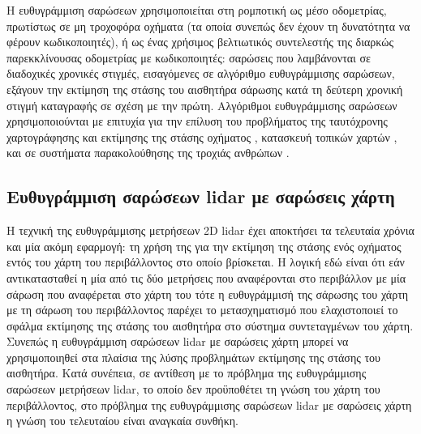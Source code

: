 \begin{gg_box}
\begin{remark}
\label{rem:sm_applications}
Η ευθυγράμμιση σαρώσεων χρησιμοποιείται στη ρομποτική ως μέσο οδομετρίας,
πρωτίστως σε μη τροχοφόρα οχήματα (τα οποία συνεπώς δεν έχουν τη δυνατότητα να
φέρουν κωδικοποιητές), ή ως ένας χρήσιμος βελτιωτικός συντελεστής της διαρκώς
παρεκκλίνουσας οδομετρίας με κωδικοποιητές: σαρώσεις που λαμβάνονται σε
διαδοχικές χρονικές στιγμές, εισαγόμενες σε αλγόριθμο ευθυγράμμισης
σαρώσεων, εξάγουν την εκτίμηση της στάσης του αισθητήρα σάρωσης κατά τη
δεύτερη χρονική στιγμή καταγραφής σε σχέση με την πρώτη. Αλγόριθμοι
ευθυγράμμισης σαρώσεων χρησιμοποιούνται με επιτυχία για την επίλυση του
προβλήματος της ταυτόχρονης χαρτογράφησης και εκτίμησης της στάσης οχήματος
\cite{Gutmann,Hahnel,Chieh-ChihWang}, κατασκευή τοπικών χαρτών
\cite{Lacroix2002a,Minguez,Montesano2008a}, και σε συστήματα παρακολούθησης της
τροχιάς ανθρώπων \cite{Schulz}.
\end{remark}
\end{gg_box}



\subsection{Ευθυγράμμιση σαρώσεων lidar με σαρώσεις χάρτη}
\label{subsec:01_01_02_6}

Η τεχνική της ευθυγράμμισης μετρήσεων 2D lidar έχει αποκτήσει τα τελευταία
χρόνια και μία ακόμη εφαρμογή: τη χρήση της για την εκτίμηση της στάσης ενός
οχήματος εντός του χάρτη του περιβάλλοντος στο οποίο βρίσκεται. Η λογική εδώ
είναι ότι εάν αντικατασταθεί η μία από τις δύο μετρήσεις που αναφέρονται στο
περιβάλλον με μία σάρωση που αναφέρεται στο χάρτη του τότε η ευθυγράμμισή
της σάρωσης του χάρτη με τη σάρωση του περιβάλλοντος παρέχει το μετασχηματισμό
που ελαχιστοποιεί το σφάλμα εκτίμησης της στάσης του αισθητήρα στο σύστημα
συντεταγμένων του χάρτη. Συνεπώς η ευθυγράμμιση σαρώσεων lidar με σαρώσεις
χάρτη μπορεί να χρησιμοποιηθεί στα πλαίσια της λύσης προβλημάτων εκτίμησης της
στάσης του αισθητήρα. Κατά συνέπεια, σε αντίθεση με το πρόβλημα της
ευθυγράμμισης σαρώσεων μετρήσεων lidar, το οποίο δεν προϋποθέτει τη γνώση του
χάρτη του περιβάλλοντος, στο πρόβλημα της ευθυγράμμισης σαρώσεων lidar με
σαρώσεις χάρτη η γνώση του τελευταίου είναι αναγκαία συνθήκη.


